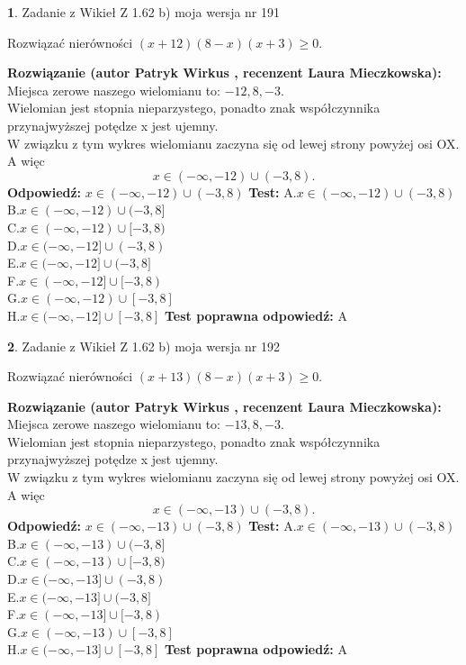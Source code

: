 \documentclass[12pt, a4paper]{article}
\theoremstyle{definition} %
\newtheorem{zad}{}
\newcommand{\zadStart}[1]{\begin{zad}#1\newline}
\newcommand{\zadStop}{\end{zad}}
\newcommand{\rozwStart}[2]{\noindent \textbf{Rozwiązanie (autor #1 , recenzent #2): }\newline}
\newcommand{\rozwStop}{\newline}
\newcommand{\odpStart}{\noindent \textbf{Odpowiedź:}\newline}
\newcommand{\odpStop}{\newline}
\newcommand{\testStart}{\noindent \textbf{Test:}\newline}
\newcommand{\testStop}{\newline}
\newcommand{\kluczStart}{\noindent \textbf{Test poprawna odpowiedź:}\newline}
\newcommand{\kluczStop}{\newline}
\begin{document}
\zadStart{Zadanie z Wikieł Z 1.62 b) moja wersja nr 191}

Rozwiązać nierówności $(x+12)(8-x)(x+3)\ge0$.
\zadStop
\rozwStart{Patryk Wirkus}{Laura Mieczkowska}
Miejsca zerowe naszego wielomianu to: $-12, 8, -3$.\\
Wielomian jest stopnia nieparzystego, ponadto znak współczynnika przy\linebreak najwyższej potędze x jest ujemny.\\ W związku z tym wykres wielomianu zaczyna się od lewej strony powyżej osi OX. A więc $$x \in (-\infty,-12) \cup (-3,8).$$
\rozwStop
\odpStart
$x \in (-\infty,-12) \cup (-3,8)$
\odpStop
\testStart
A.$x \in (-\infty,-12) \cup (-3,8)$\\
B.$x \in (-\infty,-12) \cup (-3,8]$\\
C.$x \in (-\infty,-12) \cup [-3,8)$\\
D.$x \in (-\infty,-12] \cup (-3,8)$\\
E.$x \in (-\infty,-12] \cup (-3,8]$\\
F.$x \in (-\infty,-12] \cup [-3,8)$\\
G.$x \in (-\infty,-12) \cup [-3,8]$\\
H.$x \in (-\infty,-12] \cup [-3,8]$
\testStop
\kluczStart
A
\kluczStop



\zadStart{Zadanie z Wikieł Z 1.62 b) moja wersja nr 192}

Rozwiązać nierówności $(x+13)(8-x)(x+3)\ge0$.
\zadStop
\rozwStart{Patryk Wirkus}{Laura Mieczkowska}
Miejsca zerowe naszego wielomianu to: $-13, 8, -3$.\\
Wielomian jest stopnia nieparzystego, ponadto znak współczynnika przy\linebreak najwyższej potędze x jest ujemny.\\ W związku z tym wykres wielomianu zaczyna się od lewej strony powyżej osi OX. A więc $$x \in (-\infty,-13) \cup (-3,8).$$
\rozwStop
\odpStart
$x \in (-\infty,-13) \cup (-3,8)$
\odpStop
\testStart
A.$x \in (-\infty,-13) \cup (-3,8)$\\
B.$x \in (-\infty,-13) \cup (-3,8]$\\
C.$x \in (-\infty,-13) \cup [-3,8)$\\
D.$x \in (-\infty,-13] \cup (-3,8)$\\
E.$x \in (-\infty,-13] \cup (-3,8]$\\
F.$x \in (-\infty,-13] \cup [-3,8)$\\
G.$x \in (-\infty,-13) \cup [-3,8]$\\
H.$x \in (-\infty,-13] \cup [-3,8]$
\testStop
\kluczStart
A
\kluczStop
\end{document}
